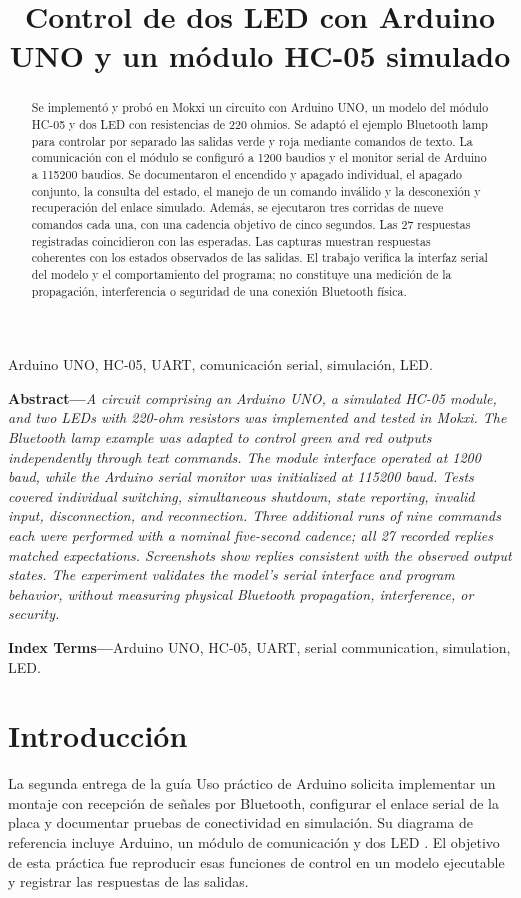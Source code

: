 \documentclass[10pt,a4paper,conference]{IEEEtran}
\title{Control de dos LED con Arduino UNO y un módulo HC-05 simulado}
\author{\IEEEauthorblockN{Leydi Adriana Martínez López, Christian David Lancheros Martínez,}
\IEEEauthorblockN{Verónica Mora Cerón, Juan Camilo Bellon y Danyela Vivian Munza Suárez}
\IEEEauthorblockA{Politécnico Grancolombiano\\Módulo Internet de las cosas\\
Docente Jesús Antonio Figueroa Guerrero\\
Entrega 2 --- Pruebas realizadas el 21 de noviembre de 2026}}
\begin{document}
\maketitle
\raggedbottom
\begin{abstract}
Se implementó y probó en Mokxi un circuito con Arduino UNO, un modelo del módulo HC-05 y dos LED con resistencias de 220 ohmios. Se adaptó el ejemplo Bluetooth lamp para controlar por separado las salidas verde y roja mediante comandos de texto. La comunicación con el módulo se configuró a 1200 baudios y el monitor serial de Arduino a 115200 baudios. Se documentaron el encendido y apagado individual, el apagado conjunto, la consulta del estado, el manejo de un comando inválido y la desconexión y recuperación del enlace simulado. Además, se ejecutaron tres corridas de nueve comandos cada una, con una cadencia objetivo de cinco segundos. Las 27 respuestas registradas coincidieron con las esperadas. Las capturas muestran respuestas coherentes con los estados observados de las salidas. El trabajo verifica la interfaz serial del modelo y el comportamiento del programa; no constituye una medición de la propagación, interferencia o seguridad de una conexión Bluetooth física.
\end{abstract}
\begin{IEEEkeywords}
Arduino UNO, HC-05, UART, comunicación serial, simulación, LED.
\end{IEEEkeywords}

\noindent\textbf{Abstract---}\textit{A circuit comprising an Arduino UNO, a simulated HC-05 module, and two LEDs with 220-ohm resistors was implemented and tested in Mokxi. The Bluetooth lamp example was adapted to control green and red outputs independently through text commands. The module interface operated at 1200 baud, while the Arduino serial monitor was initialized at 115200 baud. Tests covered individual switching, simultaneous shutdown, state reporting, invalid input, disconnection, and reconnection. Three additional runs of nine commands each were performed with a nominal five-second cadence; all 27 recorded replies matched expectations. Screenshots show replies consistent with the observed output states. The experiment validates the model's serial interface and program behavior, without measuring physical Bluetooth propagation, interference, or security.}

\noindent\textbf{Index Terms---}Arduino UNO, HC-05, UART, serial communication, simulation, LED.

\section{Introducción}
La segunda entrega de la guía Uso práctico de Arduino solicita implementar un montaje con recepción de señales por Bluetooth, configurar el enlace serial de la placa y documentar pruebas de conectividad en simulación. Su diagrama de referencia incluye Arduino, un módulo de comunicación y dos LED \cite{guia}. El objetivo de esta práctica fue reproducir esas funciones de control en un modelo ejecutable y registrar las respuestas de las salidas.
\end{document}
